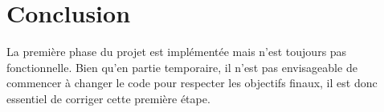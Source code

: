 \section*{Conclusion}

La première phase du projet est implémentée mais n'est toujours pas fonctionnelle. Bien qu'en partie temporaire, il n'est pas envisageable de commencer à changer le code pour respecter les objectifs finaux, il est donc essentiel de corriger cette première étape.


